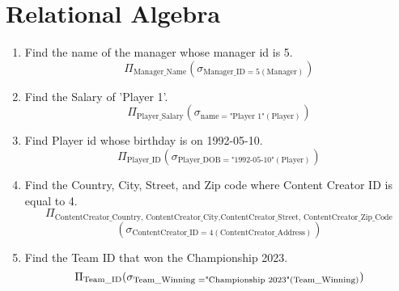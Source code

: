 \chapter{Relational Algebra}
\hrulefill

\begin{enumerate}
    \item 
    Find the name of the manager whose manager id is 5.
    $$\Pi_{\text{Manager\_Name}}(\sigma_{\text{Manager\_ID}=5(\text{Manager})})$$
    \vspace{0.2cm}
    \item 
    Find the Salary of 'Player 1'.
    $$\Pi_{\text{Player\_Salary}}(\sigma_{\text{name}=\text{"Player 1"}(\text{Player})})$$
    \vspace{0.2cm}
    \item
    Find Player id whose birthday is on 1992-05-10.
    $$\Pi_{\text{Player\_ID}}(\sigma_{\text{Player\_DOB}=\text{"1992-05-10"}(\text{Player})})$$
    \vspace{0.2cm}
    \item
    Find the Country, City, Street, and Zip code where Content Creator ID is equal to 4.
    $$\Pi_{\text{ContentCreator\_Country, ContentCreator\_City,ContentCreator\_Street, ContentCreator\_Zip\_Code}}$$
    $$(\sigma_{\text{ContentCreator\_ID}=4 (\text{ContentCreator\_Address})})$$
    \vspace{0.2cm}
    \item
    Find the Team ID that won the Championship 2023.
    $$\Pi_{\text{Team\_ID}}(\sigma_{\text{Team\_Winning =\text{"Championship 2023"}}(\text{Team\_Winning})})$$
    \vspace{0.2cm}
\end{enumerate}













